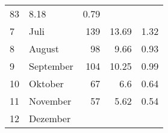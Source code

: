 \begin{longtable}{lXrrr}
       \num{83} &
       \num[round-mode=places,round-precision=2]{8,18} &
         \num[round-mode=places,round-precision=2]{0,79} \\

     7 &
     \multicolumn{1}{X}{ Juli   } &


       \num{139} &
       \num[round-mode=places,round-precision=2]{13,69} &
         \num[round-mode=places,round-precision=2]{1,32} \\

     8 &
     \multicolumn{1}{X}{ August   } &


       \num{98} &
       \num[round-mode=places,round-precision=2]{9,66} &
         \num[round-mode=places,round-precision=2]{0,93} \\

     9 &
     \multicolumn{1}{X}{ September   } &


       \num{104} &
       \num[round-mode=places,round-precision=2]{10,25} &
         \num[round-mode=places,round-precision=2]{0,99} \\

     10 &
     \multicolumn{1}{X}{ Oktober   } &


       \num{67} &
       \num[round-mode=places,round-precision=2]{6,6} &
         \num[round-mode=places,round-precision=2]{0,64} \\

     11 &
     \multicolumn{1}{X}{ November   } &


       \num{57} &
       \num[round-mode=places,round-precision=2]{5,62} &
         \num[round-mode=places,round-precision=2]{0,54} \\

     12 &
     \multicolumn{1}{X}{ Dezember   } &



\end{longtable}
